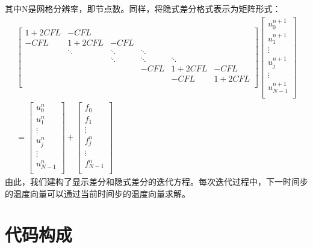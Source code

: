 \documentclass{article}
\begin{document}
		其中N是网格分辨率，即节点数。同样，将隐式差分格式表示为矩阵形式：
		$$
		\begin{aligned}
		\begin{bmatrix}
			1+2CFL & -CFL & & & & \\
			-CFL & 1+2CFL & -CFL & & &\\
			& \ddots &  \ddots & \ddots & &\\
			& & \ddots & \ddots & \ddots &\\
			& & & -CFL & 1+2CFL & -CFL \\
			& & & & -CFL & 1+2CFL\\
		\end{bmatrix}
		\begin{bmatrix}
			u_0^{n+1} \\
			u_1^{n+1} \\
			\vdots \\
			u_j^{n+1} \\
			\vdots \\
			u_{N-1}^{n+1} \\
		\end{bmatrix}
		\\
		=
		\begin{bmatrix}
			u_0^n \\
			u_1^n \\
			\vdots \\
			u_j^n \\
			\vdots \\
			u_{N-1}^n \\
		\end{bmatrix}+
		\begin{bmatrix}
			f_0 \\
			f_1 \\
			\vdots \\
			f_j^n \\
			\vdots \\
			f_{N-1}^n \\
		\end{bmatrix}
		\end{aligned}
		$$
		由此，我们建构了显示差分和隐式差分的迭代方程。每次迭代过程中，下一时间步的温度向量可以通过当前时间步的温度向量求解。
		
		\clearpage
		
		\section{代码构成}
		
\end{document}
